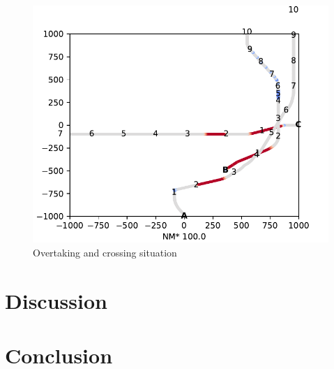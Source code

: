 \begin{figure}[H]
    \centering
    \includegraphics[width=\textwidth,height=0.75\textheight,keepaspectratio]{Figures/Scenario/overtaking-and-crossing-2-res.pdf}
    \caption{Overtaking and crossing situation }
    \label{fig:overtaking-and-crossing-2-res}
\end{figure}

\chapter{Discussion}
\chapter{Conclusion}